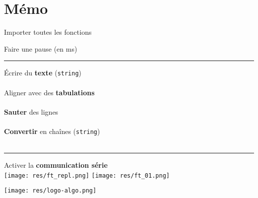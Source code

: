 
\section{Mémo \mbpy}

\begin{methode}[Essentiel]
	Importer toutes les fonctions
	~\hfill {}
	
	Faire une pause {\small(en ms)}
	\hfill {}\\
\end{methode}



\begin{minipage}[t]{0.6\linewidth}
\begin{methode}
	\rule{-0.25em}{2em}
	Écrire du \textbf{texte} (\texttt{string})
	~\hfill {}\\
	~\hfill \ex {}\\
	
	Aligner avec des \textbf{tabulations}
	~\hfill {}\\
	~\hfill \ex {}\\
	
	\textbf{Sauter} des lignes
	~\hfill {} \\
	~\hfill \ex {}\\
	
	\textbf{Convertir} en chaînes (\texttt{string})
	~\hfill {}\\
	~\hfill \ex {}\\
\end{methode}
\end{minipage}
\hfill
\begin{minipage}[t]{0.4\linewidth}
\begin{remarque}
	\rule{-0.25em}{1.7em}
	Activer la \textbf{communication série}\\[0.5em]
	\hfill
	\texttt{[image: res/ft\_repl.png]}
	\hfill
	\texttt{[image: res/ft\_01.png]}
	\hfill~
\end{remarque}

\begin{center}
	\texttt{[image: res/logo-algo.png]}
\end{center}
\end{minipage}



